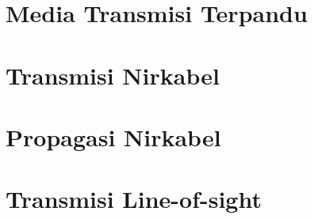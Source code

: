 \section{Media Transmisi Terpandu}

\section{Transmisi Nirkabel}

\section{Propagasi Nirkabel}

\section{Transmisi Line-of-sight}

